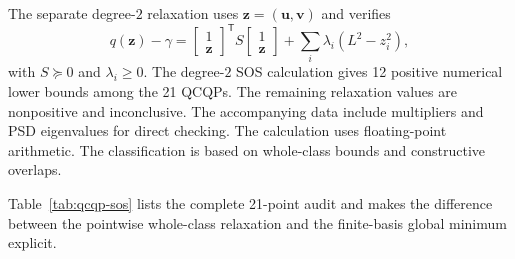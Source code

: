 \documentclass[12pt]{iopjournal}
\begin{document}
The separate degree-$2$ relaxation uses $\bm z=(\bm u,\bm v)$ and verifies
\begin{equation}
q(\bm z)-\gamma=
\begin{bmatrix}1\\\bm z\end{bmatrix}^{\!\mathsf T}
S
\begin{bmatrix}1\\\bm z\end{bmatrix}
+\sum_i\lambda_i(L^2-z_i^2),
\end{equation}
with $S\succeq0$ and $\lambda_i\ge0$. The degree-$2$ SOS calculation gives 12 positive numerical lower bounds among the 21 QCQPs. The remaining relaxation values are nonpositive and inconclusive. The accompanying data include multipliers and PSD eigenvalues for direct checking. The calculation uses floating-point arithmetic. The classification is based on whole-class bounds and constructive overlaps.

Table~\ref{tab:qcqp-sos} lists the complete 21-point audit and makes the difference between the pointwise whole-class relaxation and the finite-basis global minimum explicit.
\end{document}
